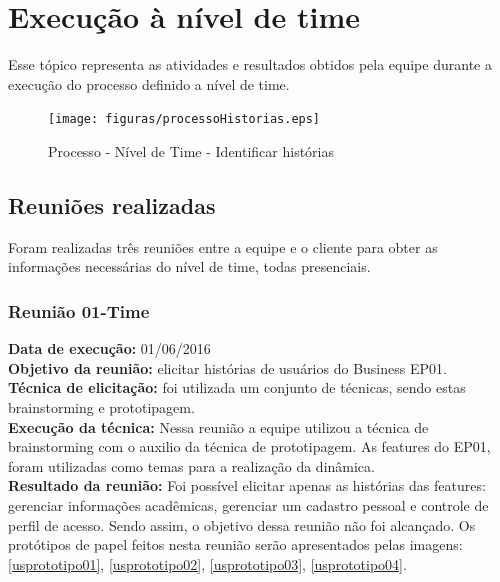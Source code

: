 \chapter[Execução à nível de time]{Execução à nível de time}

Esse tópico representa as atividades e resultados obtidos pela equipe durante a execução do processo definido a nível de time.

\begin{figure}[H]
    \centering
    \label{identificarHistorias}
    \texttt{[image: figuras/processoHistorias.eps]}
    \caption[Identificar histórias]{Processo - Nível de Time - Identificar histórias}
\end{figure}


\section{Reuniões realizadas}
Foram realizadas três reuniões entre a equipe e o cliente para obter as informações necessárias do nível de time, todas presenciais.

\subsection{Reunião 01-Time}\label{reuniao01Time}

 \indent \textbf{Data de execução:} 01/06/2016\\
 \indent \textbf{Objetivo da reunião:} elicitar histórias de usuários do Business EP01.\\
 \indent \textbf{Técnica de elicitação:} foi utilizada um conjunto de técnicas, sendo estas brainstorming e prototipagem.\\
 \indent \textbf{Execução da técnica:} Nessa reunião a equipe utilizou a técnica de brainstorming com o auxilio da técnica de prototipagem. As features do EP01, foram utilizadas como temas para a realização da dinâmica.\\
 \indent \textbf{Resultado da reunião:} Foi possível elicitar apenas as histórias das features: gerenciar informações acadêmicas, gerenciar um cadastro pessoal e controle de perfil de acesso. Sendo assim, o objetivo dessa reunião não foi alcançado. Os protótipos de papel feitos nesta reunião serão apresentados pelas imagens: \ref{usprototipo01}, \ref{usprototipo02}, \ref{usprototipo03}, \ref{usprototipo04}.\\

